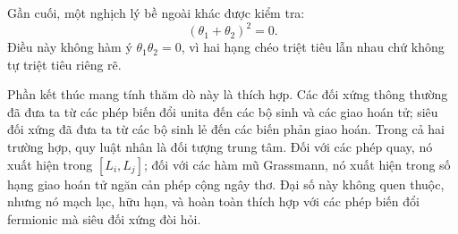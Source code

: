 Gần cuối, một nghịch lý bề ngoài khác được kiểm tra:
\begin{equation}
(\theta_1+\theta_2)^2=0.
\end{equation}
Điều này không hàm ý \(\theta_1\theta_2=0\), vì hai hạng chéo triệt tiêu lẫn nhau chứ không tự triệt tiêu riêng rẽ.

\begin{classroomqa}
\end{classroomqa}

\begin{classroomqa}
\end{classroomqa}

Phần kết thúc mang tính thăm dò này là thích hợp. Các đối xứng thông thường đã đưa ta từ các phép biến đổi unita đến các bộ sinh và các giao hoán tử; siêu đối xứng đã đưa ta từ các bộ sinh lẻ đến các biến phản giao hoán. Trong cả hai trường hợp, quy luật nhân là đối tượng trung tâm. Đối với các phép quay, nó xuất hiện trong \([L_i,L_j]\); đối với các hàm mũ Grassmann, nó xuất hiện trong số hạng giao hoán tử ngăn cản phép cộng ngây thơ. Đại số này không quen thuộc, nhưng nó mạch lạc, hữu hạn, và hoàn toàn thích hợp với các phép biến đổi fermionic mà siêu đối xứng đòi hỏi.
